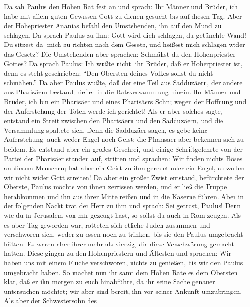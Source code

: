  Da sah Paulus den Hohen Rat fest an und sprach: Ihr
Männer und Brüder, ich habe mit allem guten Gewissen Gott zu dienen
gesucht bis auf diesen Tag.  Aber der Hohepriester Ananias
befahl den Umstehenden, ihn auf den Mund zu schlagen.  Da
sprach Paulus zu ihm: Gott wird dich schlagen, du getünchte Wand! Du
sitzest da, mich zu richten nach dem Gesetz, und heißest mich schlagen
wider das Gesetz?  Die Umstehenden aber sprachen: Schmähst
du den Hohenpriester Gottes?  Da sprach Paulus: Ich wußte
nicht, ihr Brüder, daß er Hoherpriester ist, denn es steht geschrieben:
``Den Obersten deines Volkes sollst du nicht schmähen.'' 
Da aber Paulus wußte, daß der eine Teil aus Sadduzäern, der andere aus
Pharisäern bestand, rief er in die Ratsversammlung hinein: Ihr Männer
und Brüder, ich bin ein Pharisäer und eines Pharisäers Sohn; wegen der
Hoffnung und der Auferstehung der Toten werde ich gerichtet!
 Als er aber solches sagte, entstand ein Streit zwischen
den Pharisäern und den Sadduzäern, und die Versammlung spaltete sich.
 Denn die Sadduzäer sagen, es gebe keine Auferstehung,
auch weder Engel noch Geist; die Pharisäer aber bekennen sich zu beidem.
 Es entstand aber ein großes Geschrei, und einige
Schriftgelehrte von der Partei der Pharisäer standen auf, stritten und
sprachen: Wir finden nichts Böses an diesem Menschen; hat aber ein Geist
zu ihm geredet oder ein Engel, so wollen wir nicht wider Gott streiten!
 Da aber ein großer Zwist entstand, befürchtete der
Oberste, Paulus möchte von ihnen zerrissen werden, und er ließ die
Truppe herabkommen und ihn aus ihrer Mitte reißen und in die Kaserne
führen.  Aber in der folgenden Nacht trat der Herr zu ihm
und sprach: Sei getrost, Paulus! Denn wie du in Jerusalem von mir
gezeugt hast, so sollst du auch in Rom zeugen.  Als es
aber Tag geworden war, rotteten sich etliche Juden zusammen und
verschworen sich, weder zu essen noch zu trinken, bis sie den Paulus
umgebracht hätten.  Es waren aber ihrer mehr als vierzig,
die diese Verschwörung gemacht hatten.  Diese gingen zu
den Hohenpriestern und Ältesten und sprachen: Wir haben uns mit einem
Fluche verschworen, nichts zu genießen, bis wir den Paulus umgebracht
haben.  So machet nun ihr samt dem Hohen Rate es dem
Obersten klar, daß er ihn morgen zu euch hinabführe, da ihr seine Sache
genauer untersuchen möchtet; wir aber sind bereit, ihn vor seiner
Ankunft umzubringen.  Als aber der Schwestersohn des
